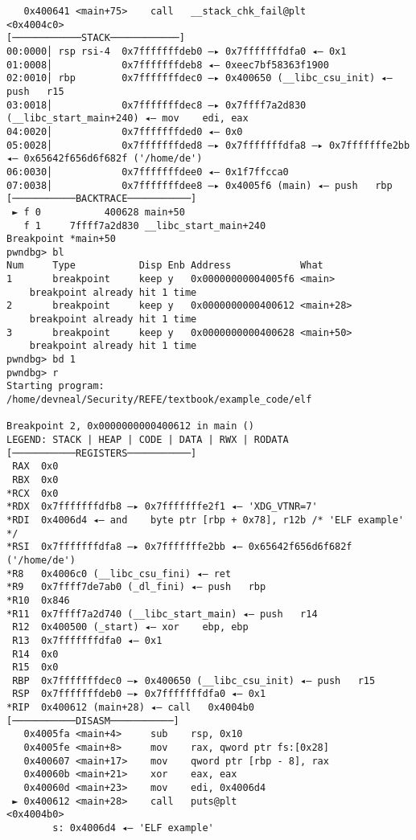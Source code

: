 \documentclass{article}
\begin{document}
\begin{lstlisting}
   0x400641 <main+75>    call   __stack_chk_fail@plt          <0x4004c0>
[────────────STACK────────────]
00:0000│ rsp rsi-4  0x7fffffffdeb0 —▸ 0x7fffffffdfa0 ◂— 0x1
01:0008│            0x7fffffffdeb8 ◂— 0xeec7bf58363f1900
02:0010│ rbp        0x7fffffffdec0 —▸ 0x400650 (__libc_csu_init) ◂— push   r15
03:0018│            0x7fffffffdec8 —▸ 0x7ffff7a2d830 (__libc_start_main+240) ◂— mov    edi, eax
04:0020│            0x7fffffffded0 ◂— 0x0
05:0028│            0x7fffffffded8 —▸ 0x7fffffffdfa8 —▸ 0x7fffffffe2bb ◂— 0x65642f656d6f682f ('/home/de')
06:0030│            0x7fffffffdee0 ◂— 0x1f7ffcca0
07:0038│            0x7fffffffdee8 —▸ 0x4005f6 (main) ◂— push   rbp
[───────────BACKTRACE───────────]
 ► f 0           400628 main+50
   f 1     7ffff7a2d830 __libc_start_main+240
Breakpoint *main+50
pwndbg> bl
Num     Type           Disp Enb Address            What
1       breakpoint     keep y   0x00000000004005f6 <main>
	breakpoint already hit 1 time
2       breakpoint     keep y   0x0000000000400612 <main+28>
	breakpoint already hit 1 time
3       breakpoint     keep y   0x0000000000400628 <main+50>
	breakpoint already hit 1 time
pwndbg> bd 1
pwndbg> r
Starting program: /home/devneal/Security/REFE/textbook/example_code/elf 

Breakpoint 2, 0x0000000000400612 in main ()
LEGEND: STACK | HEAP | CODE | DATA | RWX | RODATA
[───────────REGISTERS───────────]
 RAX  0x0
 RBX  0x0
*RCX  0x0
*RDX  0x7fffffffdfb8 —▸ 0x7fffffffe2f1 ◂— 'XDG_VTNR=7'
*RDI  0x4006d4 ◂— and    byte ptr [rbp + 0x78], r12b /* 'ELF example' */
*RSI  0x7fffffffdfa8 —▸ 0x7fffffffe2bb ◂— 0x65642f656d6f682f ('/home/de')
*R8   0x4006c0 (__libc_csu_fini) ◂— ret    
*R9   0x7ffff7de7ab0 (_dl_fini) ◂— push   rbp
*R10  0x846
*R11  0x7ffff7a2d740 (__libc_start_main) ◂— push   r14
 R12  0x400500 (_start) ◂— xor    ebp, ebp
 R13  0x7fffffffdfa0 ◂— 0x1
 R14  0x0
 R15  0x0
 RBP  0x7fffffffdec0 —▸ 0x400650 (__libc_csu_init) ◂— push   r15
 RSP  0x7fffffffdeb0 —▸ 0x7fffffffdfa0 ◂— 0x1
*RIP  0x400612 (main+28) ◂— call   0x4004b0
[───────────DISASM───────────]
   0x4005fa <main+4>     sub    rsp, 0x10
   0x4005fe <main+8>     mov    rax, qword ptr fs:[0x28]
   0x400607 <main+17>    mov    qword ptr [rbp - 8], rax
   0x40060b <main+21>    xor    eax, eax
   0x40060d <main+23>    mov    edi, 0x4006d4
 ► 0x400612 <main+28>    call   puts@plt                      <0x4004b0>
        s: 0x4006d4 ◂— 'ELF example'
 

\end{lstlisting}
\end{document}
